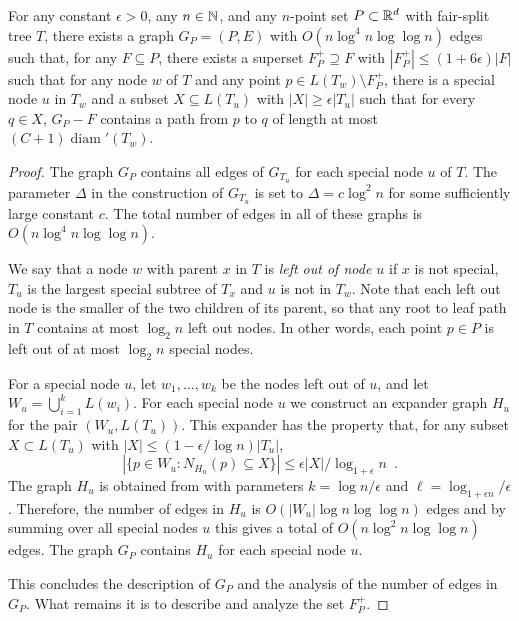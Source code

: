 \documentclass{patmorin}
\DeclareMathOperator{\diam}{diam}
\begin{document}
\begin{lem}
  For any constant $\epsilon >0$, any $n\in\mathbb{N}$, and any $n$-point
  set $P\subset\mathbb{R}^d$ with fair-split tree $T$, there exists a graph
  $G_P=(P,E)$ with $O(n\log^4 n\log\log n)$ edges such that, for any 
  $F\subseteq
  P$, there exists a superset $F^+_P\supseteq F$ with $|F^+_P|\le
  (1+6\epsilon)|F|$ such that for any node $w$ of $T$ and any point
  $p\in L(T_w)\setminus F^+_P$, there is a special node $u$ in $T_w$
  and a subset $X\subseteq L(T_u)$
  with $|X|\ge \epsilon|T_u|$ such that for every $q\in X$, $G_P-F$
  contains a path from $p$ to $q$ of length at most $(C+1)\diam'(T_w)$.
\end{lem}


\begin{proof}
  The graph $G_P$ contains all edges of $G_{T_u}$ for each special node
  $u$ of $T$.  The parameter $\Delta$ in the construction of $G_{T_u}$
  is set to $\Delta=c\log^2 n$ for some sufficiently large constant $c$.
  The total number of edges in all of these graphs is $O(n\log^4
  n\log\log n)$.  

  We say that a node $w$ with parent $x$ in $T$ is \emph{left out of
  node $u$} if $x$ is not special, $T_u$ is the largest special subtree
  of $T_x$ and $u$ is not in $T_w$. Note that each left out node is the
  smaller of the two children of its parent, so that any root to leaf
  path in $T$ contains at most $\log_2 n$ left out nodes.  In other words,
  each point $p\in P$ is left out of at most $\log_2 n$ special nodes.
	
  For a special node $u$, let $w_1,\ldots,w_k$ be the nodes left out of $u$, and  let $W_u=\bigcup_{i=1}^k L(w_i)$.  For each special node $u$ we construct
  an expander graph $H_u$ for the pair
  $(W_u,L(T_u))$. This expander has the property that, for any
  subset $X\subset L(T_u)$ with $|X|\le (1-\epsilon/\log n)|T_u|$, 
  \[ |\{p\in W_u: N_{H_u}(p)\subseteq X\}| \le \epsilon|X|/\log_{1+\epsilon} n \enspace . \] 
  The graph $H_u$ is obtained from  with parameters
  $k=\log n/\epsilon$ and $\ell=\log_{1+\epsilon n}/\epsilon$.  Therefore,
  the number of edges in $H_u$ is $O(|W_u|\log n\log\log n)$ edges and
  by summing over all special nodes $u$ this gives a total of $O(n\log^2
  n\log\log n)$ edges.  The graph $G_P$ contains $H_u$ for each special
  node $u$.

  This concludes the description of $G_P$ and the analysis of the number
  of edges in $G_P$. What remains it is to describe and analyze the
  set $F^+_P$.



\end{proof}
\end{document}
